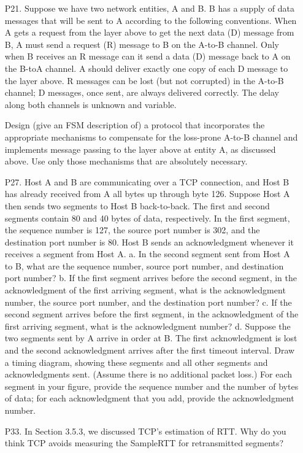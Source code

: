 \documentclass[]{article}
\begin{document}
\begin{enumerate}
	\item[P21.] Suppose we have two network entities, A and B. B has a supply of data messages that will be sent to A according to the following conventions. When A	gets a request from the layer above to get the next data (D) message from B, A must send a request (R) message to B on the A-to-B channel. Only when B	receives an R message can it send a data (D) message back to A on the B-toA channel. A should deliver exactly one copy of each D message to the layer	above. R messages can be lost (but not corrupted) in the A-to-B channel; D	messages, once sent, are always delivered correctly. The delay along both channels is unknown and variable. 
	
	Design (give an FSM description of) a protocol that incorporates the appropriate mechanisms to compensate for the loss-prone A-to-B channel and implements message passing to the layer above at entity A, as discussed above. Use only those mechanisms that are absolutely necessary.
	
	
	\item[P27.] Host A and B are communicating over a TCP connection, and Host B has already received from A all bytes up through byte 126. Suppose Host A then sends two segments to Host B back-to-back. The first and second segments	contain 80 and 40 bytes of data, respectively. In the first segment, the sequence number is 127, the source port number is 302, and the destination	port number is 80. Host B sends an acknowledgment whenever it receives a segment from Host A.
	\subitem a. In the second segment sent from Host A to B, what are the sequence number, source port number, and destination port number?
	\subitem b. If the first segment arrives before the second segment, in the acknowledgment of the first arriving segment, what is the acknowledgment number,
	the source port number, and the destination port number?
	\subitem c. If the second segment arrives before the first segment, in the acknowledgment of the first arriving segment, what is the acknowledgment
	number?
	\subitem d. Suppose the two segments sent by A arrive in order at B. The first acknowledgment is lost and the second acknowledgment arrives after the first timeout interval. Draw a timing diagram, showing these segments and all other segments and acknowledgments sent. (Assume there is no additional packet loss.) For each segment in your figure, provide the sequence number and	the number of bytes of data; for each acknowledgment that you add, provide the acknowledgment number.
	
	
	\item[P33.] In Section 3.5.3, we discussed TCP’s estimation of RTT. Why do you think TCP avoids measuring the SampleRTT for retransmitted segments?
	
\end{enumerate}
\end{document}
